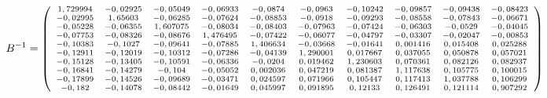 \documentclass[12pt]{article}
\begin{document}
\begin{equation*}
	\scriptsize
	B^{-1} =  \left(
	\begin{array}{cccccccccc}
		1,729994 & -0,02925 & -0,05049 & -0,06933 & -0,0874 & -0,0963 & -0,10242 & -0,09857 & -0,09438 & -0,08423 \\
		-0,02995 & 1,65603 & -0,06285 & -0,07624 & -0,08853 & -0,0918 & -0,09293 & -0,08558 & -0,07843 & -0,06671 \\
		-0,05228 & -0,06355 & 1,607075 & -0,08034 & -0,08403 & -0,07963 & -0,07424 & -0,06303 & -0,0529 & -0,04045 \\
		-0,07753 & -0,08326 & -0,08676 & 1,476495 & -0,07422 & -0,06077 & -0,04797 & -0,03307 & -0,02047 & -0,00853 \\
		-0,10383 & -0,1027 & -0,09641 & -0,07885 & 1,406634 & -0,03668 & -0,01641 & 0,001416 & 0,015408 & 0,025288 \\
		-0,12911 & -0,12019 & -0,10312 & -0,07286 & -0,04139 & 1,290001 & 0,017667 & 0,037055 & 0,050878 & 0,057021 \\
		-0,15128 & -0,13405 & -0,10591 & -0,06336 & -0,0204 & 0,019462 & 1,230603 & 0,070361 & 0,082126 & 0,082937 \\
		-0,16841 & -0,14279 & -0,104 & -0,05052 & 0,002036 & 0,047219 & 0,081387 & 1,117638 & 0,105775 & 0,100015 \\
		-0,17899 & -0,14526 & -0,09689 & -0,03471 & 0,024597 & 0,071966 & 0,105447 & 0,117413 & 1,037788 & 0,106299 \\
		-0,182 & -0,14078 & -0,08442 & -0,01649 & 0,045997 & 0,091895 & 0,12133 & 0,126491 & 0,121114 & 0,907292		
	\end{array}
	\right)
\end{equation*}
\end{document}
